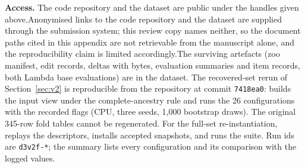 \textbf{Access.} \ifarxivpreprint The code repository and the dataset are public under the handles given above.\else Anonymised links to the code repository and the dataset are supplied through the submission system; this review copy names neither, so the document paths cited in this appendix are not retrievable from the manuscript alone, and the reproducibility claim is limited accordingly.\fi The surviving artefacts (zoo manifest, edit records, deltas with bytes, evaluation summaries and item records, both Lambda base evaluations) are in the dataset. The recovered-set rerun of Section~\ref{sec:v2} is reproducible from the repository at commit \texttt{7418ea0}:  builds the input view under the complete-ancestry rule and  runs the 26 configurations with the recorded flags (CPU, three seeds, 1,000 bootstrap draws). The original 345-row fold tables cannot be regenerated. For the full-set re-instantiation,  replays the descriptors,  installs accepted snapshots, and  runs the suite. Run ids are \texttt{d3v2f-*}; the summary lists every configuration and its comparison with the logged values.
